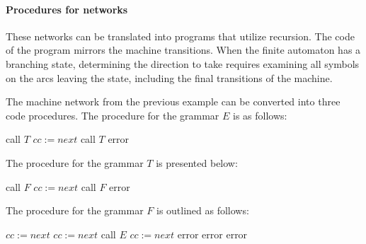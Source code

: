 \paragraph*{Procedures for networks}
These networks can be translated into programs that utilize recursion. 
The code of the program mirrors the machine transitions. 
When the finite automaton has a branching state, determining the direction to take requires examining all symbols on the arcs leaving the state, including the final transitions of the machine.
\begin{example}
    The machine network from the previous example can be converted into three code procedures. 
    The procedure for the grammar $E$ is as follows:
    \begin{algorithmic}[1]
        \State call $T$
            \State $cc:=next$
            \State call $T$
        \EndWhile
            \State \Return
        \Else 
            \State error
        \EndIf
    \end{algorithmic}
    The procedure for the grammar $T$ is presented below:
    \begin{algorithmic}[1]
        \State call $F$
            \State $cc:=next$
            \State call $F$
        \EndWhile
            \State \Return
        \Else 
            \State error
        \EndIf
    \end{algorithmic}
    The procedure for the grammar $F$ is outlined as follows:
    \begin{algorithmic}[1]
            \State $cc:=next$
            \State $cc:=next$
            \State call $E$
                \State $cc:=next$
                    \State \Return
                \Else 
                    \State error
                \EndIf
            \Else 
                \State error
            \EndIf
        \Else 
            \State error
        \EndIf
    \end{algorithmic}
\end{example}